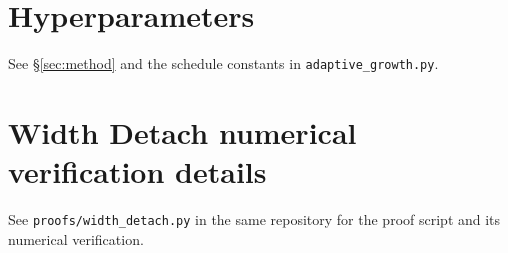 \documentclass{article}
\begin{document}
\section{Hyperparameters}
\label{app:hyperparams}
See \S\ref{sec:method} and the schedule constants in
\texttt{adaptive\_growth.py}.

\section{Width Detach numerical verification details}
See \texttt{proofs/width\_detach.py} in the same repository for the proof
script and its numerical verification.
\end{document}
